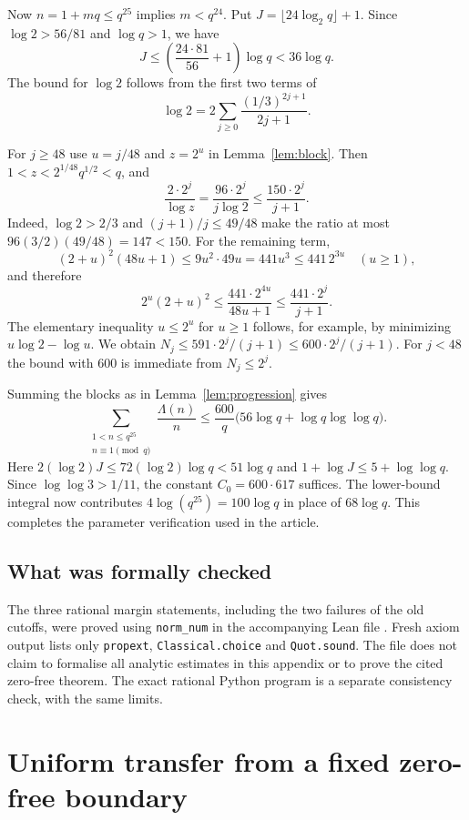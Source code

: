 \documentclass[screen,reqno]{aomart}
\numberwithin{equation}{section}
\theoremstyle{definition}
\begin{document}
Now $n=1+mq\le q^{25}$ implies $m<q^{24}$. Put
$J=\lfloor24\log_2q\rfloor+1$. Since
$\log2>56/81$ and $\log q>1$, we have
\[
 J\le\left(\frac{24\cdot81}{56}+1\right)\log q<36\log q.
\]
The bound for $\log2$ follows from the first two terms of
\[\log2=2\sum_{j\ge0}\frac{(1/3)^{2j+1}}{2j+1}.\]

For $j\ge48$ use $u=j/48$ and $z=2^u$ in Lemma~\ref{lem:block}.
Then $1<z<2^{1/48}q^{1/2}<q$, and
\[
 \frac{2\cdot2^j}{\log z}
 =\frac{96\cdot2^j}{j\log2}
 \le\frac{150\cdot2^j}{j+1}.
\]
Indeed, $\log2>2/3$ and $(j+1)/j\le49/48$ make the ratio at most
$96(3/2)(49/48)=147<150$. For the remaining term,
\[
 (2+u)^2(48u+1)\le9u^2\cdot49u=441u^3\le441\,2^{3u}
 \quad(u\ge1),
\]
and therefore
\[
 2^u(2+u)^2\le\frac{441\cdot2^{4u}}{48u+1}
 \le\frac{441\cdot2^j}{j+1}.
\]
The elementary inequality $u\le2^u$ for $u\ge1$ follows, for example,
by minimizing $u\log2-\log u$. We obtain
$N_j\le591\cdot2^j/(j+1)\le600\cdot2^j/(j+1)$.
For $j<48$ the bound with $600$ is immediate from $N_j\le2^j$.

Summing the blocks as in Lemma~\ref{lem:progression} gives
\[
 \sum_{\substack{1<n\le q^{25}\\n\equiv1\pmod q}}
       \frac{\Lambda(n)}n
 \le\frac{600}{q}\bigl(56\log q+\log q\log\log q\bigr).
\]
Here $2(\log2)J\le72(\log2)\log q<51\log q$ and
$1+\log J\le5+\log\log q$. Since $\log\log3>1/11$,
the constant $C_0=600\cdot617$ suffices. The lower-bound integral
now contributes $4\log(q^{25})=100\log q$ in place of $68\log q$.
This completes the parameter verification used in the article.

\subsection{What was formally checked}
The three rational margin statements, including the two failures of the old
cutoffs, were proved using \texttt{norm\_num} in the accompanying
Lean file . Fresh axiom output lists only
\texttt{propext}, \texttt{Classical.choice} and \texttt{Quot.sound}.
The file does not claim to formalise all analytic estimates in this
appendix or to prove the cited zero-free theorem. The exact rational
Python program is a separate consistency check, with the same limits.

\section{Uniform transfer from a fixed zero-free boundary}
\label{app:uniformtransfer}
\end{document}
